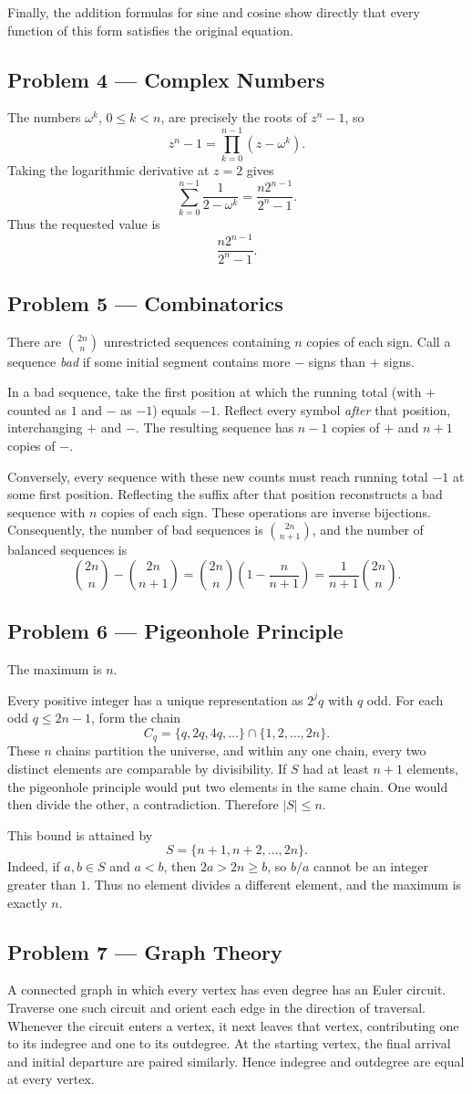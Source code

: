 \documentclass[11pt,a4paper]{article}
\newcommand{\solution}[2]{\subsection*{Problem #1 --- #2}}
\begin{document}
Finally, the addition formulas for sine and cosine show directly that every
function of this form satisfies the original equation.

\solution{4}{Complex Numbers}
The numbers $\omega^k$, $0\le k<n$, are precisely the roots of $z^n-1$, so
\[
  z^n-1=\prod_{k=0}^{n-1}(z-\omega^k).
\]
Taking the logarithmic derivative at $z=2$ gives
\[
  \sum_{k=0}^{n-1}\frac1{2-\omega^k}
  =\frac{n2^{n-1}}{2^n-1}.
\]
Thus the requested value is
\[
  \boxed{\dfrac{n2^{n-1}}{2^n-1}}.
\]

\solution{5}{Combinatorics}
There are $\binom{2n}{n}$ unrestricted sequences containing $n$ copies of
each sign. Call a sequence \emph{bad} if some initial segment contains more
$-$ signs than $+$ signs.

In a bad sequence, take the first position at which the running total (with
$+$ counted as $1$ and $-$ as $-1$) equals $-1$. Reflect every symbol
\emph{after} that position, interchanging $+$ and $-$. The resulting sequence
has $n-1$ copies of $+$ and $n+1$ copies of $-$.

Conversely, every sequence with these new counts must reach running total
$-1$ at some first position. Reflecting the suffix after that position
reconstructs a bad sequence with $n$ copies of each sign. These operations
are inverse bijections. Consequently, the number of bad sequences is
$\binom{2n}{n+1}$, and the number of balanced sequences is
\[
  \binom{2n}{n}-\binom{2n}{n+1}
  =\binom{2n}{n}\left(1-\frac n{n+1}\right)
  =\boxed{\frac1{n+1}\binom{2n}{n}}.
\]

\solution{6}{Pigeonhole Principle}
The maximum is $\boxed{n}$.

Every positive integer has a unique representation as $2^j q$ with $q$ odd.
For each odd $q\le 2n-1$, form the chain
\[
  C_q=\{q,2q,4q,\ldots\}\cap\{1,2,\ldots,2n\}.
\]
These $n$ chains partition the universe, and within any one chain, every two
distinct elements are comparable by divisibility. If $S$ had at least $n+1$
elements, the pigeonhole principle would put two elements in the same chain.
One would then divide the other, a contradiction. Therefore $|S|\le n$.

This bound is attained by
\[
  S=\{n+1,n+2,\ldots,2n\}.
\]
Indeed, if $a,b\in S$ and $a<b$, then $2a>2n\ge b$, so $b/a$ cannot be an
integer greater than $1$. Thus no element divides a different element, and
the maximum is exactly $n$.

\solution{7}{Graph Theory}
A connected graph in which every vertex has even degree has an Euler circuit.
Traverse one such circuit and orient each edge in the direction of traversal.
Whenever the circuit enters a vertex, it next leaves that vertex, contributing
one to its indegree and one to its outdegree. At the starting vertex, the
final arrival and initial departure are paired similarly. Hence indegree and
outdegree are equal at every vertex.
\end{document}
